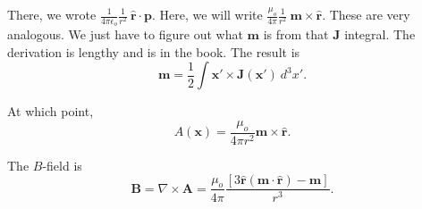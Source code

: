 \documentclass{article}
\numberwithin{equation}{section}
\newcommand{\rhat}{\mathbf{\hat{r}}}
\begin{document}
There, we wrote $\frac{1}{4\pi\epsilon_o} \frac{1}{r^2}\ \rhat \cdot \bm{p}$. Here, we will write $\frac{\mu_o}{4\pi} \frac{1}{r^2}\ \bm{m}\times\rhat$. These are very analogous. We just have to figure out what $\bm{m}$ is from that $\bm{J}$ integral. The derivation is lengthy and is in the book. The result is
\begin{equation*}
    \bm{m} = \frac{1}{2} \int \bm{x}' \times \bm{J}(\bm{x}')\ d^3x'.
\end{equation*}

At which point,
\begin{equation*}
    A(\bm{x}) = \frac{\mu_o}{4\pi r^2} \bm{m} \times \rhat.
\end{equation*}

The $B$-field is
\begin{equation*}
    \boxed{\bm{B} = \nabla \times \bm{A} = \frac{\mu_o}{4\pi}\frac{\left[ 3 \rhat \left( \bm{m} \cdot \rhat \right) - \bm{m} \right]}{r^3}.}
\end{equation*}
\end{document}
